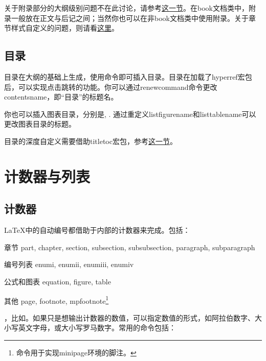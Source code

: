 {关于附录\latexline{\\appendix}部分的大纲级别问题不在此讨论，请参考\hyperref[sec:appendix]{这一节}。在book文档类中，附录一般放在正文与后记之间；当然你也可以在非book文档类中使用附录。关于章节样式自定义的问题，则请看\hyperref[sec:titlesec]{这里}。

\subsection{目录}
目录在大纲的基础上生成，使用命令\latexline{\\tableofcontents}即可插入目录。目录在加载了hyperref宏包后，可以实现点击跳转的功能。你可以通过renewcommand命令更改contentsname，即“目录”的标题名。

你也可以插入图表目录，分别是\latexline{\\listoffigures}, \latexline{\\listoftables}. 通过重定义listfigurename和listtablename可以更改图表目录的标题。

目录的深度自定义需要借助titletoc宏包，参考\hyperref[sec:titletoc]{这一节}。

\section{计数器与列表}

\subsection{计数器}
\LaTeX 中的自动编号都借助于内部的计数器来完成。包括：
\begin{fead}
\item[章节] part, chapter, section, subsection, subsubsection, paragraph, subparagraph
\item[编号列表] enumi, enumii, enumiii, enumiv
\item[公式和图表] equation, figure, table
\item[其他] page, footnote, mpfootnote\footnote{\latexline{\\mpfootnote}命令用于实现minipage环境的脚注。}
\end{fead}

，比如\latexline{\\thechapter}。如果只是想输出计数器的数值，可以指定数值的形式，如阿拉伯数字、大小写英文字母，或大小写罗马数字。常用的命令包括：
\begin{latex}{}
\Alph \alph \Roman \roman
\end{latex}

}
